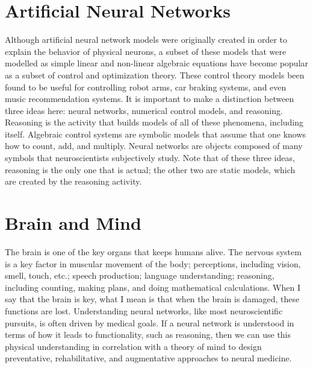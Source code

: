 \section{Artificial Neural Networks}

Although artificial neural network models were originally created in
order to explain the behavior of physical neurons, a subset of these
models that were modelled as simple linear and non-linear algebraic
equations have become popular as a subset of control and optimization
theory.  These control theory models been found to be useful for
controlling robot arms, car braking systems, and even music
recommendation systems.  It is important to make a distinction between
three ideas here: neural networks, numerical control models, and
reasoning.  Reasoning is the activity that builds models of all of
these phenomena, including itself.  Algebraic control systems are
symbolic models that assume that one knows how to count, add, and
multiply.  Neural networks are objects composed of many symbols that
neuroscientists subjectively study.  Note that of these three ideas,
reasoning is the only one that is actual; the other two are static
models, which are created by the reasoning activity.

\section{Brain and Mind}

The brain is one of the key organs that keeps humans alive.  The
nervous system is a key factor in muscular movement of the body;
perceptions, including vision, smell, touch, etc.; speech production;
language understanding; reasoning, including counting, making plans,
and doing mathematical calculations.  When I say that the brain is
key, what I mean is that when the brain is damaged, these functions
are lost.  Understanding neural networks, like most neuroscientific
pursuits, is often driven by medical goals.  If a neural network is
understood in terms of how it leads to functionality, such as
reasoning, then we can use this physical understanding in correlation
with a theory of mind to design preventative, rehabilitative, and
augmentative approaches to neural medicine.

